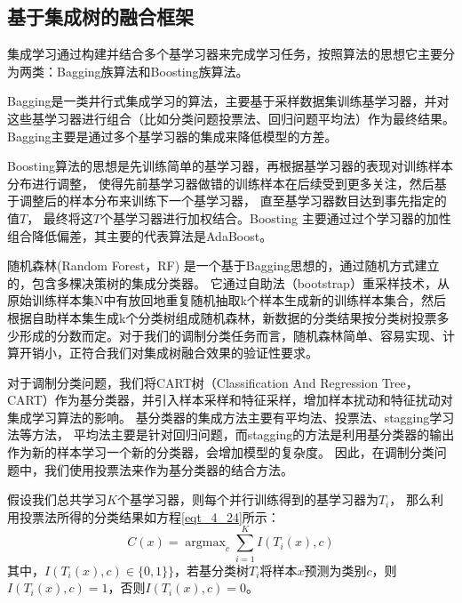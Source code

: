 \subsection{基于集成树的融合框架}
集成学习通过构建并结合多个基学习器来完成学习任务，按照算法的思想它主要分为两类：Bagging族算法和Boosting族算法。\par

Bagging\cite{breiman1996bagging}是一类井行式集成学习的算法，主要基于采样数据集训练基学习器，并对这些基学习器进行组合（比如分类问题投票法、回归问题平均法）作为最终结果。Bagging主要是通过多个基学习器的集成来降低模型的方差。

Boosting算法\cite{freund1999short}的思想是先训练简单的基学习器，再根据基学习器的表现对训练样本分布进行调整，
使得先前基学习器做错的训练样本在后续受到更多关注，然后基于调整后的样本分布来训练下一个基学习器，
直至基学习器数目达到事先指定的值$T$， 最终将这$T$个基学习器进行加权结合。Boosting 主要通过过个学习器的加性组合降低偏差，其主要的代表算法是AdaBoost\cite{freund1996experiments}。\par

随机森林(Random Forest，RF) \cite{liaw2002classification}是一个基于Bagging思想的，通过随机方式建立的，包含多棵决策树的集成分类器。
它通过自助法（bootstrap）重采样技术，从原始训练样本集N中有放回地重复随机抽取k个样本生成新的训练样本集合，然后根据自助样本集生成k个分类树组成随机森林，新数据的分类结果按分类树投票多少形成的分数而定。对于我们的调制分类任务而言，随机森林简单、容易实现、计算开销小，正符合我们对集成树融合效果的验证性要求。\par


对于调制分类问题，我们将CART树（Classification And Regression Tree，CART）\cite{breiman2017classification}作为基分类器，并引入样本采样和特征采样，增加样本扰动和特征扰动对集成学习算法的影响。
基分类器的集成方法主要有平均法、投票法、stagging学习法等方法，
平均法主要是针对回归问题，而stagging的方法是利用基分类器的输出作为新的样本学习一个新的分类器，会增加模型的复杂度\cite{周志华2016机器学习}。
因此，在调制分类问题中，我们使用投票法来作为基分类器的结合方法。\par

假设我们总共学习$K$个基学习器，则每个并行训练得到的基学习器为$T_{i}$，
那么利用投票法所得的分类结果如方程\eqref{eqt_4_24}所示：
\begin{equation}
	\label{eqt_4_24}
	C(x) = \mathop{\arg\max}_{c} \sum_{i=1}^{K} I(T_i(x), c)
\end{equation}
其中，$I(T_i(x), c) \in \{0, 1\}\}$，若基分类树$T_{i}$将样本$x$预测为类别$c$，则$I(T_i(x), c)=1$，否则$I(T_i(x), c)=0$。\par

